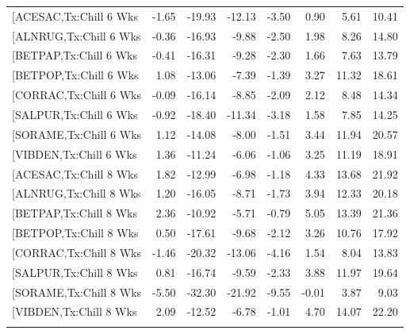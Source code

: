 \documentclass{article}\usepackage[]{graphicx}\usepackage[]{color}
\begin{document}
\begin{longtable}{lrrrrrrr}
  [ACESAC,Tx:Chill 6 Wks & -1.65 & -19.93 & -12.13 & -3.50 & 0.90 & 5.61 & 10.41 \\ 
  [ALNRUG,Tx:Chill 6 Wks & -0.36 & -16.93 & -9.88 & -2.50 & 1.98 & 8.26 & 14.80 \\ 
  [BETPAP,Tx:Chill 6 Wks & -0.41 & -16.31 & -9.28 & -2.30 & 1.66 & 7.63 & 13.79 \\ 
  [BETPOP,Tx:Chill 6 Wks & 1.08 & -13.06 & -7.39 & -1.39 & 3.27 & 11.32 & 18.61 \\ 
  [CORRAC,Tx:Chill 6 Wks & -0.09 & -16.14 & -8.85 & -2.09 & 2.12 & 8.48 & 14.34 \\ 
  [SALPUR,Tx:Chill 6 Wks & -0.92 & -18.40 & -11.34 & -3.18 & 1.58 & 7.85 & 14.25 \\ 
  [SORAME,Tx:Chill 6 Wks & 1.12 & -14.08 & -8.00 & -1.51 & 3.44 & 11.94 & 20.57 \\ 
  [VIBDEN,Tx:Chill 6 Wks & 1.36 & -11.24 & -6.06 & -1.06 & 3.25 & 11.19 & 18.91 \\ 
  [ACESAC,Tx:Chill 8 Wks & 1.82 & -12.99 & -6.98 & -1.18 & 4.33 & 13.68 & 21.92 \\ 
  [ALNRUG,Tx:Chill 8 Wks & 1.20 & -16.05 & -8.71 & -1.73 & 3.94 & 12.33 & 20.18 \\ 
  [BETPAP,Tx:Chill 8 Wks & 2.36 & -10.92 & -5.71 & -0.79 & 5.05 & 13.39 & 21.36 \\ 
  [BETPOP,Tx:Chill 8 Wks & 0.50 & -17.61 & -9.68 & -2.12 & 3.26 & 10.76 & 17.92 \\ 
  [CORRAC,Tx:Chill 8 Wks & -1.46 & -20.32 & -13.06 & -4.16 & 1.54 & 8.04 & 13.83 \\ 
  [SALPUR,Tx:Chill 8 Wks & 0.81 & -16.74 & -9.59 & -2.33 & 3.88 & 11.97 & 19.64 \\ 
  [SORAME,Tx:Chill 8 Wks & -5.50 & -32.30 & -21.92 & -9.55 & -0.01 & 3.87 & 9.03 \\ 
  [VIBDEN,Tx:Chill 8 Wks & 2.09 & -12.52 & -6.78 & -1.01 & 4.70 & 14.07 & 22.20 \\ 
   \hline
\hline
\label{tab:suppmodgs}
\end{longtable}
\end{document}
